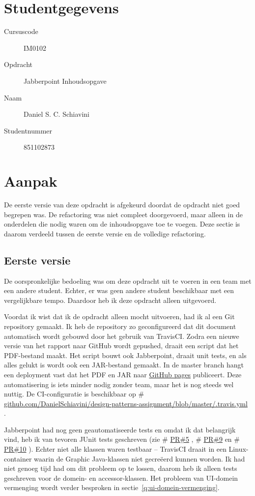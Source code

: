 \documentclass[a4paper]{article}
\makeatletter
\newcommand*{\repo}{\begingroup\@makeother\#\@repo}
\newcommand*{\@repo}[2]{%
  \href{https://github.com/DanielSchiavini/design-patterns-assignment/#1}{#2}%
  \endgroup}
\newcommand{\PR}[1]{\repo{pull/#1}{PR\##1}}
\newcommand{\repolink}[1]{\repo{#1}{github.com\-/Daniel\-Schiavini\-/de\-sign-\-pat\-terns-\-as\-sign\-ment\-/#1}}
\makeatother
\begin{document}
\pagestyle{fancy}

\section*{Studentgegevens}
    \begin{description}
        \item [Cursuscode] IM0102
        \item [Opdracht] Jabberpoint Inhoudsopgave
        \item [Naam] Daniel S. C. Schiavini
        \item [Studentnummer] 851102873
    \end{description}

\section*{Aanpak}
    \label{sec:aanpak}
	De eerste versie van deze opdracht is afgekeurd doordat de opdracht niet goed begrepen was.
	De refactoring was niet compleet doorgevoerd, maar alleen in de onderdelen die nodig waren om de inhoudsopgave toe te voegen.
	Deze sectie is daarom verdeeld tussen de eerste versie en de volledige refactoring.

	\subsection{Eerste versie}
    De oorspronkelijke bedoeling was om deze opdracht uit te voeren in een team met een andere student.
    Echter, er was geen andere student beschikbaar met een vergelijkbare tempo.
    Daardoor heb ik deze opdracht alleen uitgevoerd.

    Voordat ik wist dat ik de opdracht alleen mocht uitvoeren, had ik al een Git repository gemaakt.
    Ik heb de repository zo geconfigureerd dat dit document automatisch wordt gebouwd door het gebruik van TravisCI.
    Zodra een nieuwe versie van het rapport naar GitHub wordt gepushed, draait een script dat het PDF-bestand maakt.
    Het script bouwt ook Jabberpoint, draait unit tests, en als alles gelukt is wordt ook een JAR-bestand gemaakt.
    In de master branch hangt een deployment vast dat het PDF en JAR naar \href{https://github.com/DanielSchiavini/design-patterns-assignment/tree/gh-pages}{GitHub pages} publiceert.
    Deze automatisering is iets minder nodig zonder team, maar het is nog steeds wel nuttig.
    De CI-configuratie is beschikbaar op \repolink{blob/master/.travis.yml}.

    Jabberpoint had nog geen geautomatiseerde tests en omdat ik dat belangrijk vind, heb ik van tevoren JUnit tests geschreven (zie \PR{5}, \PR{9} en \PR{10}).
    Echter niet alle klassen waren testbaar -- TravisCI draait in een Linux-container waarin de Graphic Java-klassen niet gecreëerd kunnen worden.
    Ik had niet genoeg tijd had om dit probleem op te lossen, daarom heb ik alleen tests geschreven voor de domein- en accessor-klassen.
    Het probleem van UI-domein vermenging wordt verder besproken in sectie~\ref{q:ui-domein-vermenging}.
\end{document}
